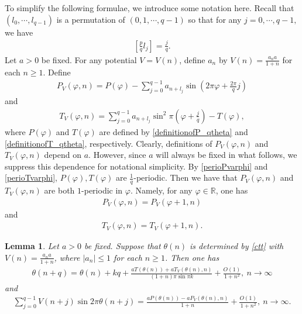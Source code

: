 \documentclass[12pt]{amsart}
\newcommand{\abs}[1]{\left\lvert #1 \right\rvert}
\theoremstyle{plain}
\newtheorem{lemma}[theorem]{Lemma}
\newcommand{\R}{\mathbb{R}}
\theoremstyle{definition}
\begin{document}
	To simplify the following formulae, we introduce some notation here. Recall that $(l_0,\cdots, l_{q-1})$ is a permutation of $(0,1,\cdots,q-1)$ so that for any $j=0,\cdots,q-1,$ we have
	\begin{align}
		\left[\frac{p}{q}l_j\right]=\frac{j}{q}.\label{finalmod}
	\end{align}
	Let $a>0$ be fixed. For any potential $V=V(n)$, define $a_n$ by $V(n)=\frac{a_na}{1+n}$ for each $n\geq 1$. Define
	\begin{align}
			P_V(\varphi,n)=P(\varphi)-\sum_{j=0}^{q-1}a_{n+l_j}\sin\left(2\pi\varphi+\frac{2\pi}{q}j\right)\label{definitionofPVtheta}
	\end{align}
	and 
	\begin{align}
		T_V(\varphi,n)=\sum_{j=0}^{q-1}a_{n+l_j}\sin^2\pi\left(\varphi+\frac{j}{q}\right)-T(\varphi),\label{definitionofTVtheta}
	\end{align}
	where $P(\varphi)$ and $T(\varphi)$ are defined by \eqref{definitionofP_qtheta} and \eqref{definitionofT_qtheta}, respectively.
	Clearly, definitions of $P_V(\varphi,n)$ and $T_V(\varphi,n)$
 depend on $a$. However, since $a$
 will always be fixed in what follows, we suppress this dependence for notational simplicity.
	By \eqref{perioPvarphi} and \eqref{perioTvarphi}, $P(\varphi),T(\varphi)$ are $\frac{1}{q}$-periodic. Then we have that $P_V(\varphi,n)$ and $T_V(\varphi,n)$ are both $1$-periodic in $\varphi$. Namely,
	for any $\varphi\in\R$, one has
	\begin{align}
		P_V(\varphi,n)=P_V\left(\varphi+1,n\right)\label{periodPV}
	\end{align}
	and 
	\begin{align}
		T_V(\varphi,n)=T_V\left(\varphi+1,n\right)\label{periodTV}.
	\end{align}
	\begin{lemma}
	Let $a>0$ be fixed.	Suppose that $\theta(n)$ is determined by \eqref{ctt} with $V(n)=\frac{a_na}{1+n}$, where $\abs{a_n}\leq 1$ for each $n\geq 1$. Then one has 
		\begin{align}\label{relationoftheta}
			\theta(n+q)=\theta(n)+kq+\frac{aT(\theta(n))+aT_V(\theta(n),n)}{(1+n)\pi\sin\pi k}+\frac{O(1)}{1+n^2},\ n\to\infty
		\end{align}
		and 
		\begin{align}\label{pqthetapathetan}
			\sum_{j=0}^{q-1}V(n+j)\sin2\pi\theta(n+j)=\frac{aP(\theta(n))-aP_V(\theta(n),n)}{1+n}+\frac{O(1)}{1+n^2},\ n\to\infty.
		\end{align}
	\end{lemma}
\end{document}
